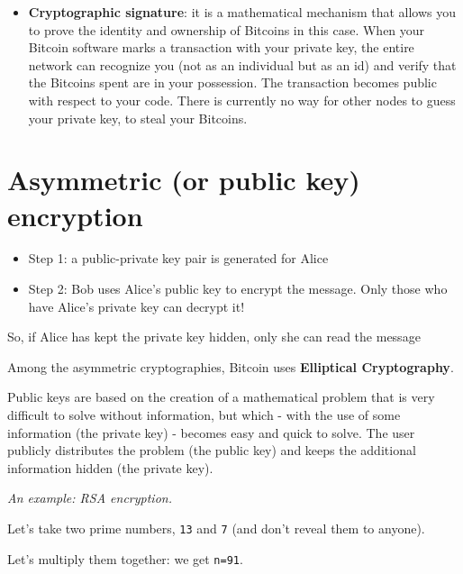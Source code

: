 
\begin{itemize}
	\item \textbf{Cryptographic signature}: it is a mathematical mechanism that allows you to prove the identity and ownership of Bitcoins in this case.
	When your Bitcoin software marks a transaction with your private key, the entire network can recognize you (not as an individual but as an id) and verify that the Bitcoins spent are in your possession. The transaction becomes public with respect to your code. There is currently no way for other nodes to guess your private key, to steal your Bitcoins.
\end{itemize}


\section{Asymmetric (or public key) encryption}

\begin{itemize}
	\item Step 1: a public-private key pair is generated for Alice
	\item Step 2: Bob uses Alice's public key to encrypt the message. Only those who have Alice's private key can decrypt it!
\end{itemize}

So, if Alice has kept the private key hidden, only she can read the message


Among the asymmetric cryptographies, Bitcoin uses \textbf{Elliptical Cryptography}.

Public keys are based on the creation of a mathematical problem that is very difficult to solve without information, but which - with the use of some information (the private key) - becomes easy and quick to solve. The user publicly distributes the problem (the public key) and keeps the additional information hidden (the private key).

\textit{An example: RSA encryption.}

Let's take two prime numbers, \texttt{13} and \texttt{7} (and don't reveal them to anyone).

Let's multiply them together: we get \texttt{n=91}.

